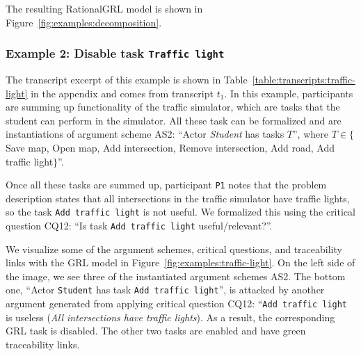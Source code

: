 The resulting RationalGRL model is shown in Figure~\ref{fig:examples:decomposition}.


\subsubsection{Example 2: Disable task \texttt{Traffic light}}

The transcript excerpt of this example is shown in Table~\ref{table:transcripts:traffic-light} in the appendix and comes from transcript $t_1$. In this example, participants are summing up functionality of the traffic simulator, which are tasks that the student can perform in the simulator. All these task can be formalized and are instantiations of argument scheme AS2: ``Actor \emph{Student} has tasks $T$'', where $T\in\{$Save map, Open map, Add intersection, Remove intersection, Add road, Add traffic light$\}$''. 

Once all these tasks are summed up, participant \texttt{P1} notes that the problem description states that all intersections in the traffic simulator have traffic lights, so the task \texttt{Add traffic light} is not useful. We formalized this using the critical question CQ12: ``Is task \texttt{Add traffic light} useful/relevant?''.

We visualize some of the argument schemes, critical questions, and traceability links with the GRL model in Figure~\ref{fig:examples:traffic-light}. On the left side of the image, we see three of the instantiated argument schemes AS2. The bottom one, ``Actor \texttt{Student} has task \texttt{Add traffic light}'', is attacked by another argument generated from applying critical question CQ12: ``\texttt{Add traffic light} is useless (\emph{All intersections have traffic lights}). As a result, the corresponding GRL task is disabled. The other two tasks are enabled and have green traceability links.

